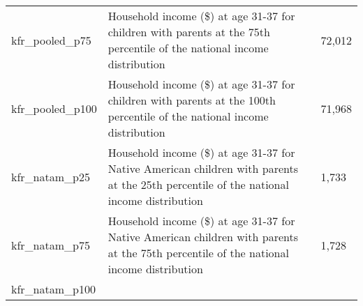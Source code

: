 \documentclass[]{book}
\begin{document}
\begin{longtable}[]{@{}lll@{}}
\begin{minipage}[t]{0.04\columnwidth}
kfr\_pooled\_p75\strut
\end{minipage} & \begin{minipage}[t]{0.04\columnwidth}\raggedright\strut
Household income (\$) at age 31-37 for children with parents at the 75th
percentile of the national income distribution\strut
\end{minipage} & \begin{minipage}[t]{0.04\columnwidth}\raggedright\strut
72,012\strut
\end{minipage}\tabularnewline
\begin{minipage}[t]{0.04\columnwidth}\raggedright\strut
kfr\_pooled\_p100\strut
\end{minipage} & \begin{minipage}[t]{0.04\columnwidth}\raggedright\strut
Household income (\$) at age 31-37 for children with parents at the
100th percentile of the national income distribution\strut
\end{minipage} & \begin{minipage}[t]{0.04\columnwidth}\raggedright\strut
71,968\strut
\end{minipage}\tabularnewline
\begin{minipage}[t]{0.04\columnwidth}\raggedright\strut
kfr\_natam\_p25\strut
\end{minipage} & \begin{minipage}[t]{0.04\columnwidth}\raggedright\strut
Household income (\$) at age 31-37 for Native American children with
parents at the 25th percentile of the national income distribution\strut
\end{minipage} & \begin{minipage}[t]{0.04\columnwidth}\raggedright\strut
1,733\strut
\end{minipage}\tabularnewline
\begin{minipage}[t]{0.04\columnwidth}\raggedright\strut
kfr\_natam\_p75\strut
\end{minipage} & \begin{minipage}[t]{0.04\columnwidth}\raggedright\strut
Household income (\$) at age 31-37 for Native American children with
parents at the 75th percentile of the national income distribution\strut
\end{minipage} & \begin{minipage}[t]{0.04\columnwidth}\raggedright\strut
1,728\strut
\end{minipage}\tabularnewline
\begin{minipage}[t]{0.04\columnwidth}\raggedright\strut
kfr\_natam\_p100\strut
\end{minipage} & \begin{minipage}[t]{0.04\columnwidth}\raggedright\strut

\end{minipage}
\end{longtable}
\end{document}
